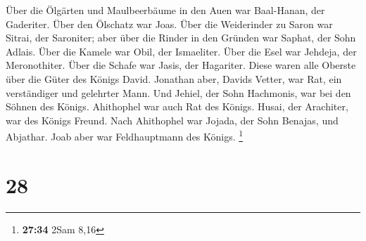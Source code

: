  Über die Ölgärten und Maulbeerbäume in den Auen war
Baal-Hanan, der Gaderiter. Über den Ölschatz war Joas. 
Über die Weiderinder zu Saron war Sitrai, der Saroniter; aber über die
Rinder in den Gründen war Saphat, der Sohn Adlais.  Über
die Kamele war Obil, der Ismaeliter. Über die Esel war Jehdeja, der
Meronothiter.  Über die Schafe war Jasis, der Hagariter.
Diese waren alle Oberste über die Güter des Königs David.
 Jonathan aber, Davids Vetter, war Rat, ein verständiger
und gelehrter Mann. Und Jehiel, der Sohn Hachmonis, war bei den Söhnen
des Königs.  Ahithophel war auch Rat des Königs. Husai,
der Arachiter, war des Königs Freund.  Nach Ahithophel
war Jojada, der Sohn Benajas, und Abjathar. Joab aber war Feldhauptmann
des Königs. \footnote{\textbf{27:34} 2Sam 8,16}

\hypertarget{section-5}{%
\section{28}\label{section-5}}

